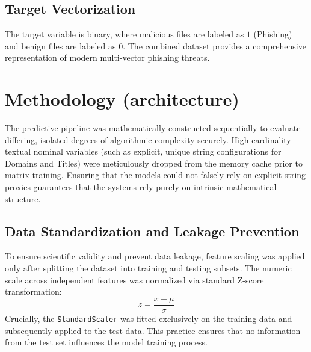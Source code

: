 \documentclass[12pt,a4paper]{article}
\begin{document}
\subsection{Target Vectorization}
The target variable is binary, where malicious files are labeled as $1$ (Phishing) and benign files are labeled as $0$. The combined dataset provides a comprehensive representation of modern multi-vector phishing threats.

\section{Methodology (architecture)}
The predictive pipeline was mathematically constructed sequentially to evaluate differing, isolated degrees of algorithmic complexity securely. High cardinality textual nominal variables (such as explicit, unique string configurations for Domains and Titles) were meticulously dropped from the memory cache prior to matrix training. Ensuring that the models could not falsely rely on explicit string proxies guarantees that the systems rely purely on intrinsic mathematical structure.

\subsection{Data Standardization and Leakage Prevention}
To ensure scientific validity and prevent data leakage, feature scaling was applied only after splitting the dataset into training and testing subsets. The numeric scale across independent features was normalized via standard Z-score transformation:
\begin{equation}
z = \frac{x - \mu}{\sigma}
\end{equation}
Crucially, the \texttt{StandardScaler} was fitted exclusively on the training data and subsequently applied to the test data. This practice ensures that no information from the test set influences the model training process.
\end{document}
